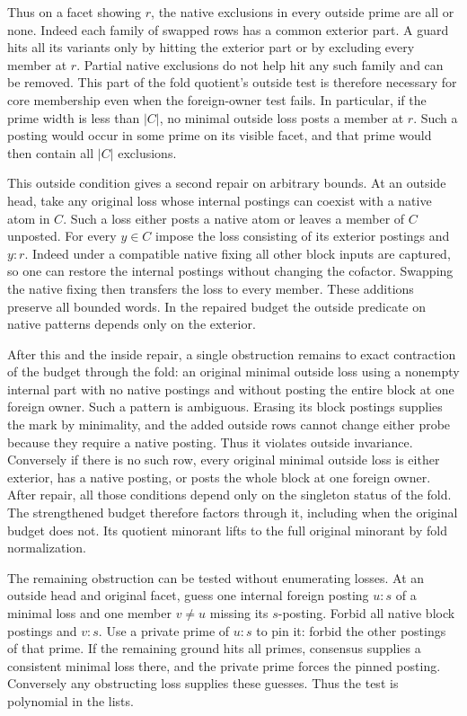 Thus on a facet showing $r$, the native exclusions
in every outside prime are all or none. Indeed each
family of swapped rows has a common exterior part.
A guard hits all its variants only by hitting the
exterior part or by excluding every member at $r$.
Partial native exclusions do not help hit any such
family and can be removed. This part of the fold
quotient's outside test is therefore necessary for
core membership even when the foreign-owner test
fails. In particular, if the prime width is less
than $|C|$, no minimal outside loss posts a member
at $r$. Such a posting would occur in some prime
on its visible facet, and that prime would then
contain all $|C|$ exclusions.

This outside condition gives a second repair on
arbitrary bounds. At an outside head, take any
original loss whose internal postings can coexist
with a native atom in $C$. Such a loss either
posts a native atom or leaves a member of $C$
unposted. For every $y\in C$ impose the loss
consisting of its exterior postings and $y:r$.
Indeed under a compatible native fixing all
other block inputs are captured, so one can
restore the internal postings without changing
the cofactor. Swapping the native fixing then
transfers the loss to every member. These
additions preserve all bounded words. In the
repaired budget the outside predicate on
native patterns depends only on the exterior.

After this and the inside repair, a single
obstruction remains to exact contraction of
the budget through the fold: an original
minimal outside loss using a nonempty internal
part with no native postings and without
posting the entire block at one foreign owner.
Such a pattern is ambiguous. Erasing its block
postings supplies the mark by minimality, and
the added outside rows cannot change either
probe because they require a native posting.
Thus it violates outside invariance. Conversely
if there is no such row, every original
minimal outside loss is either exterior, has
a native posting, or posts the whole block at
one foreign owner. After repair, all those
conditions depend only on the singleton
status of the fold. The strengthened budget
therefore factors through it, including when
the original budget does not. Its quotient
minorant lifts to the full original minorant
by fold normalization.

The remaining obstruction can be tested
without enumerating losses. At an outside
head and original facet, guess one internal
foreign posting $u:s$ of a minimal loss and
one member $v\ne u$ missing its $s$-posting.
Forbid all native block postings and $v:s$.
Use a private prime of $u:s$ to pin it:
forbid the other postings of that prime.
If the remaining ground hits all primes,
consensus supplies a consistent minimal
loss there, and the private prime forces
the pinned posting. Conversely any
obstructing loss supplies these guesses.
Thus the test is polynomial in the lists.

